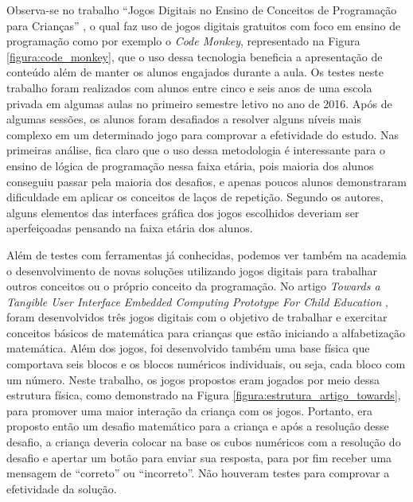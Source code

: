 Observa-se no trabalho “Jogos Digitais no Ensino de Conceitos de Programação para Crianças” \cite{tadesco_2016}, o qual faz uso de jogos digitais gratuitos com foco em ensino de programação como por exemplo o \textit{Code Monkey}, representado na Figura \ref{figura:code_monkey}, que o uso dessa tecnologia beneficia a apresentação de conteúdo além de manter os alunos engajados durante a aula. Os testes neste trabalho foram realizados com alunos entre cinco e seis anos de uma escola privada em algumas aulas no primeiro semestre letivo no ano de 2016. Após de algumas sessões, os alunos foram desafiados a resolver alguns níveis mais complexo em um determinado jogo para comprovar a efetividade do estudo. Nas primeiras análise, fica claro que o uso dessa metodologia é  interessante para o ensino de lógica de programação nessa faixa etária, pois maioria dos alunos conseguiu passar pela maioria dos desafios, e apenas poucos alunos demonstraram dificuldade em aplicar os conceitos de laços de repetição. Segundo os autores, alguns elementos das interfaces gráfica dos jogos escolhidos deveriam ser aperfeiçoadas pensando na faixa etária dos alunos.

Além de testes com ferramentas já conhecidas, podemos ver também na academia o desenvolvimento de novas soluções utilizando jogos digitais para trabalhar outros conceitos ou o próprio conceito da programação. No artigo \textit{Towards a Tangible User Interface Embedded Computing Prototype For Child Education} \cite{carneiro_2018}, foram desenvolvidos três jogos digitais com o objetivo de trabalhar e exercitar conceitos básicos de matemática para crianças que estão iniciando a alfabetização matemática. Além dos jogos, foi desenvolvido também uma base física que comportava seis blocos e os blocos numéricos individuais, ou seja, cada bloco com um número. Neste trabalho, os jogos propostos eram jogados por meio dessa estrutura física, como demonstrado na Figura \ref{figura:estrutura_artigo_towards}, para promover uma maior interação da criança com os jogos. Portanto, era proposto então um desafio matemático para a criança e após a resolução desse desafio, a criança deveria colocar na base os cubos numéricos com a resolução do desafio e apertar um botão para enviar sua resposta, para por fim receber uma mensagem de “correto” ou “incorreto”. Não houveram testes para comprovar a efetividade da solução. 


